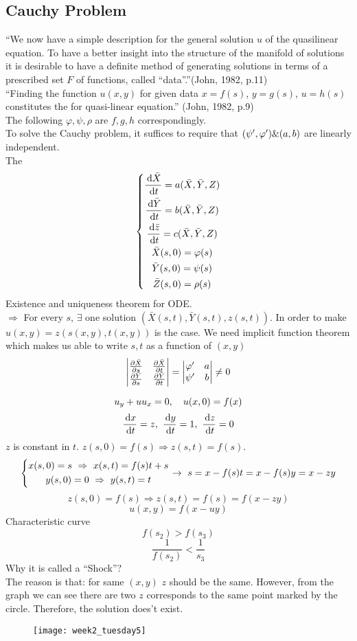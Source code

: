 \subsection{Cauchy Problem}
``We now have a simple description for the general solution $u$ of the quasilinear equation. To have a better insight into the structure of the manifold of solutions it is desirable to have a definite method of generating solutions in terms of a prescribed set $F$ of functions, called ``data''.''(John, 1982, p.11)\\
``Finding the function $u(x,y)$ for given data $x=f(s)$, $y=g(s)$, $u=h(s)$ constitutes the  for quasi-linear equation.'' (John, 1982, p.9)\\ The following $\varphi, \psi, \rho$ are $f, g, h$ correspondingly.\\
To solve the Cauchy problem, it suffices to require that $(\psi^{\prime},\varphi^{\prime})\&(a,b)$ are linearly independent.\\The
\[\left\{\begin{gathered}\frac{\,\mathrm{d}\bar{X}}{\,\mathrm{d} t}=a(\bar{X},\bar{Y},Z)\\\frac{\,\mathrm{d}\bar{Y}}{\,\mathrm{d} t}=b(\bar{X},\bar{Y},Z)\\\frac{\,\mathrm{d}\bar{z}}{\,\mathrm{d} t}=c(\bar{X},\bar{Y},Z)\\\bar{X}(s,0)=\varphi(s)\\\bar{Y}(s,0)=\psi(s)\\\bar{Z}(s,0)=\rho(s)\end{gathered}\right.
\]
Existence and uniqueness theorem for ODE.\\
$\Rightarrow$ For every $s$, $\exists$ one solution $(\bar{X}(s,t),\bar{Y}(s,t),z(s,t))$. In order to make $u(x,y)=z(s(x,y),t(x,y))$ is the case. We need implicit function theorem which makes us able to write $s, t$ as a function of $(x,y)$
\[\begin{vmatrix}\frac{\partial{\bar{X}}}{\partial{s}}&\frac{\partial{\bar{X}}}{\partial{t}}\\\frac{\partial{\bar{Y}}}{\partial{s}}&\frac{\partial{\bar{Y}}}{\partial{t}}\end{vmatrix}=\begin{vmatrix}\varphi^{\prime}&a\\\psi^{\prime}&b\end{vmatrix}\neq0
\]
\begin{example}
\[u_y+uu_x=0, \quad u(x,0)=f(x)\]
\[\frac{\,\mathrm{d} x}{\,\mathrm{d} t}=z,~\frac{\,\mathrm{d} y}{\,\mathrm{d} t}=1,~\frac{\,\mathrm{d} z}{\,\mathrm{d} t}=0
\]
$z$ is constant in $t$. $z(s, 0)=f(s)\Rightarrow z(s,t)=f(s)$.
\[\left\{\begin{gathered}x(s,0)=s~\Rightarrow~x(s,t)=f(s)t+s\\y(s,0)=0~\Rightarrow~y(s,t)=t\end{gathered}\right.\rightarrow ~s=x-f(s)t=x-f(s)y=x-zy
\]
\[z(s,0)=f(s)\Rightarrow z(s,t)=f(s)=f(x-zy)
\]
\[u(x,y)=f(x-uy)
\]
Characteristic curve
\[f(s_2)>f(s_3)
\]
\[\frac{1}{f(s_2)}<\frac{1}{s_3}
\]
Why it is called a ``Shock''?\\The reason is that: for same $(x,y)$ $z$ should be the same. However, from the graph we can see there are two $z$ corresponds to the same point marked by the circle. Therefore, the solution does't exist.
\begin{figure}[H]
\centering
\texttt{[image: week2\_tuesday5]}
\end{figure}



\end{example}
